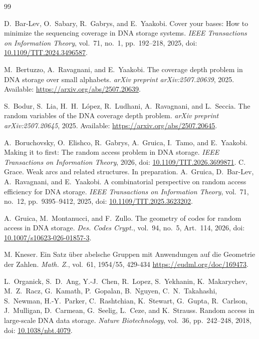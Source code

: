 \documentclass{article}
\begin{document}
\begin{thebibliography}{99}






D.~Bar-Lev, O.~Sabary, R.~Gabrys, and E.~Yaakobi. Cover your bases: How to minimize the sequencing coverage in DNA storage systems.
\emph{IEEE Transactions on Information Theory}, vol.~71, no.~1, pp.~192--218, 2025,
doi: \href{https://doi.org/10.1109/TIT.2024.3496587}{10.1109/TIT.2024.3496587}.

M.~Bertuzzo, A.~Ravagnani, and E.~Yaakobi.
The coverage depth problem in DNA storage over small alphabets.
\emph{arXiv preprint arXiv:2507.20639}, 2025.
Available: \url{https://arxiv.org/abs/2507.20639}.

S.~Bodur, S.~Lia, H.~H.~L\'opez, R.~Ludhani, A.~Ravagnani, and L.~Seccia.
The random variables of the DNA coverage depth problem.
\emph{arXiv preprint arXiv:2507.20645}, 2025.
Available: \url{https://arxiv.org/abs/2507.20645}.

A.~Boruchovsky, O.~Elishco, R.~Gabrys, A.~Gruica, I.~Tamo, and E.~Yaakobi. Making it to first: The random access problem in DNA storage.
\emph{IEEE Transactions on Information Theory}, 2026,
doi: \href{https://doi.org/10.1109/TIT.2026.3699871}{10.1109/TIT.2026.3699871}.
C. Grace. Weak arcs and related structures. In preparation.
A.~Gruica, D.~Bar-Lev, A.~Ravagnani, and E.~Yaakobi. A combinatorial perspective on random access efficiency for DNA storage.
\emph{IEEE Transactions on Information Theory}, vol.~71, no.~12, pp.~9395--9412, 2025,
doi: \href{https://doi.org/10.1109/TIT.2025.3623202}{10.1109/TIT.2025.3623202}.

A.~Gruica, M.~Montanucci, and F.~Zullo. The geometry of codes for random access in DNA storage.
\emph{Des. Codes Crypt.}, vol.~94, no.~5, Art.~114, 2026,
doi: \href{https://doi.org/10.1007/s10623-026-01857-3}{10.1007/s10623-026-01857-3}.

 M. Kneser. Ein Satz über abelsche Gruppen mit Anwendungen auf die Geometrie der Zahlen.
{\em Math. Z.}, vol.~61, 1954/55,
{429-434} \href{https://eudml.org/doc/169473}{https://eudml.org/doc/169473}.

L.~Organick, S.~D.~Ang, Y.-J.~Chen, R.~Lopez, S.~Yekhanin, K.~Makarychev,
M.~Z.~Racz, G.~Kamath, P.~Gopalan, B.~Nguyen, C.~N.~Takahashi,
S.~Newman, H.-Y.~Parker, C.~Rashtchian, K.~Stewart, G.~Gupta,
R.~Carlson, J.~Mulligan, D.~Carmean, G.~Seelig, L.~Ceze, and K.~Strauss.
Random access in large-scale DNA data storage.
\emph{Nature Biotechnology}, vol.~36, pp.~242--248, 2018,
doi: \href{https://doi.org/10.1038/nbt.4079}{10.1038/nbt.4079}.


\end{thebibliography}
\end{document}
